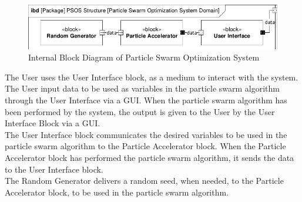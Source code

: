 \begin{figure}[H]
	\centering
	\includegraphics[width=0.8\linewidth]{diagram/ibd_particle_swarm_optimization_system.pdf}
	\caption{Internal Block Diagram of Particle Swarm Optimization System}
	\label{fig:ibd}
\end{figure}

The User uses the User Interface block, as a medium to interact with the system. The User input data to be used as variables in the particle swarm algorithm through the User Interface via a GUI. When the particle swarm algorithm has been performed by the system, the output is given to the User by the User Interface Block via a GUI.\\

The User Interface block communicates the desired variables to be used in the particle swarm algorithm to the Particle Accelerator block. When the Particle Accelerator block has performed the particle swarm algorithm, it sends the data to the User Interface block.\\

The Random Generator delivers a random seed, when needed, to the Particle Accelerator block, to be used in the particle swarm algorithm.\\

